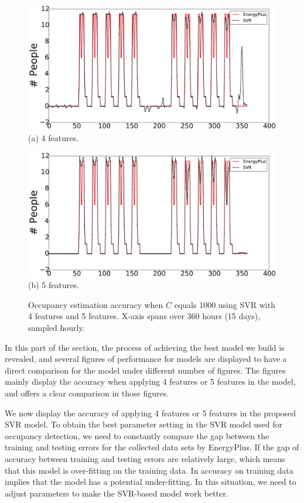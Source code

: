 \begin{figure}[h]
\begin{minipage}{\textwidth}
\centering\includegraphics[width=5in]{./Pics/1000C4Features.eps}
(a) 4 features.
\end{minipage}
\hfill

\vspace{3ex}

\noindent\begin{minipage}{\textwidth}
\centering\includegraphics[width=5in]{./Pics/1000C5Features.eps}
(b) 5 features.
\end{minipage}
\hfill
\caption{Occupancy estimation accuracy when $C$ equals 1000 using SVR with 4
    features and 5 features. X-axis spans over 360 hours (15 days), sampled
    hourly.}\label{fig:compare3}
\end{figure}


In this part of the section, the process of achieving the best model we build
is revealed, and several figures of performance for models are displayed to
have a direct comparison for the model under different number of figures. The
figures mainly display the accuracy when applying 4 features or 5 features in
the model, and offers a clear comparison in those figures.

We now display the accuracy of applying 4 features or 5 features in the
proposed SVR model. To obtain the best parameter setting in the SVR model used
for occupancy detection, we need to constantly compare the gap between the
training and testing errors for the collected data sets by EnergyPlus. If the
gap of accuracy between training and testing errors are relatively large, which
means that this model is over-fitting on the training data. In accuracy on
training data implies that the model has a potential under-fitting. In this
situation, we need to adjust parameters to make the SVR-based model work
better.

